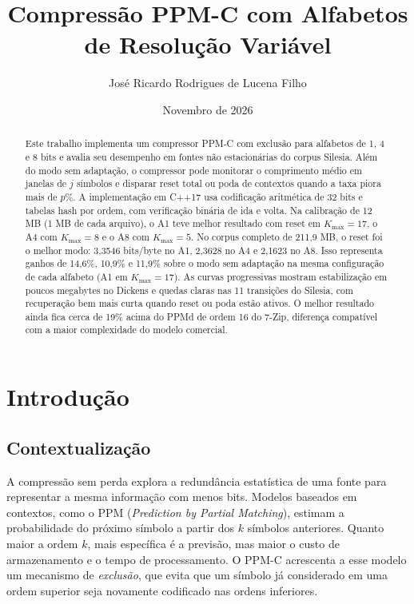 \documentclass[12pt,a4paper]{article}
\title{Compress\~ao PPM-C com Alfabetos de Resolu\c{c}\~ao Vari\'avel}
\author{Jos\'e Ricardo Rodrigues de Lucena Filho}
\date{Novembro de 2026}
\begin{document}
\maketitle

\begin{abstract}
Este trabalho implementa um compressor PPM-C com exclus\~ao para alfabetos de 1, 4 e
8 bits e avalia seu desempenho em fontes n\~ao estacion\'arias do corpus Silesia.
Al\'em do modo sem adapta\c{c}\~ao, o compressor pode monitorar o comprimento m\'edio
em janelas de $j$ s\'imbolos e disparar reset total ou poda de contextos quando a
taxa piora mais de $p\%$. A implementa\c{c}\~ao em C++17 usa codifica\c{c}\~ao
aritm\'etica de 32 bits e tabelas hash por ordem, com verifica\c{c}\~ao bin\'aria
de ida e volta. Na calibra\c{c}\~ao de 12 MB (1 MB de cada arquivo), o A1 teve
melhor resultado com reset em $K_{\max}=17$, o A4 com $K_{\max}=8$ e o A8 com
$K_{\max}=5$. No corpus completo de 211,9 MB, o reset foi o melhor modo: 3,3546
bits/byte no A1, 2,3628 no A4 e 2,1623 no A8. Isso representa ganhos de 14,6\%,
10,9\% e 11,9\% sobre o modo sem adapta\c{c}\~ao na mesma configura\c{c}\~ao de cada
alfabeto (A1 em $K_{\max}=17$). As curvas progressivas mostram estabiliza\c{c}\~ao
em poucos megabytes no Dickens e quedas claras nas 11 transi\c{c}\~oes do Silesia,
com recupera\c{c}\~ao bem mais curta quando reset ou poda est\~ao ativos. O melhor
resultado ainda fica cerca de 19\% acima do PPMd de ordem 16 do 7-Zip, diferen\c{c}a
compat\'ivel com a maior complexidade do modelo comercial.
\end{abstract}

\tableofcontents

\section{Introdu\c{c}\~ao}

\subsection{Contextualiza\c{c}\~ao}
A compress\~ao sem perda explora a redund\^ancia estat\'istica de uma fonte para
representar a mesma informa\c{c}\~ao com menos bits. Modelos baseados em contextos,
como o PPM (\emph{Prediction by Partial Matching}), estimam a probabilidade do
pr\'oximo s\'imbolo a partir dos $k$ s\'imbolos anteriores. Quanto maior a ordem
$k$, mais espec\'ifica \'e a previs\~ao, mas maior o custo de armazenamento e o
tempo de processamento. O PPM-C acrescenta a esse modelo um mecanismo de
\emph{exclus\~ao}, que evita que um s\'imbolo j\'a considerado em uma ordem superior
seja novamente codificado nas ordens inferiores.
\end{document}
